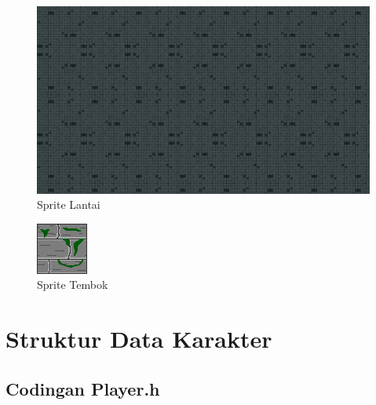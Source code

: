 \documentclass[oneside, a4paper ,12pt]{book}
\begin{document}
\begin{figure} [h]
	\centering
	\includegraphics[width=10 cm]{Floor.png}
	\caption{Sprite Lantai}
\end{figure}
\begin{figure} [h]
	\centering
	\includegraphics[width=8 cm]{Wall.png}
	\caption{Sprite Tembok}
\end{figure}

\chapter{Struktur Data Karakter}
\section{Codingan Player.h}
\end{document}
